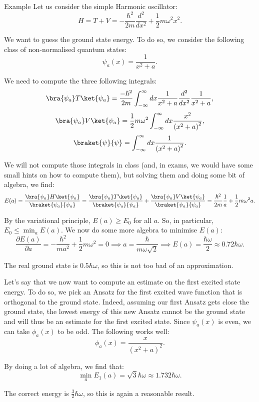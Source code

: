 \documentclass[a4paper]{article}
\begin{document}
\begin{parag}{Example}
    Let us consider the simple Harmonic oscillator: 
    \[H = T + V = -\frac{\hbar^2}{2m} \frac{d^2}{dx^2} + \frac{1}{2} m \omega^2 x^2.\]

    We want to guess the ground state energy. To do so, we consider the following class of non-normalised quantum states: 
    \[\psi_a\left(x\right) = \frac{1}{x^2 + a}.\]

    We need to compute the three following integrals: 
    \[\bra{\psi_a} T \ket{\psi_a} = \frac{-\hbar^2}{2m} \int_{-\infty}^{\infty} dx \frac{1}{x^2 + a} \frac{d^2}{dx^2} \frac{1}{x^2 + a},\]
    \[\bra{\psi_a} V \ket{\psi_a} = \frac{1}{2} m \omega^2 \int_{-\infty}^{\infty} dx \frac{x^2}{\left(x^2 + a\right)^2},\] 
    \[\braket{\psi}{\psi} = \int_{-\infty}^{\infty} dx \frac{1}{\left(x^2 + a\right)^2}.\]

    We will not compute those integrals in class (and, in exams, we would have some small hints on how to compute them), but solving them and doing some bit of algebra, we find: 
    \[E\left(a\right) = \frac{\bra{\psi_a} H \ket{\psi_a}}{\braket{\psi_a}{\psi_a}} = \frac{\bra{\psi_a} T \ket{\psi_a}}{\braket{\psi_a}{\psi_a}} + \frac{\bra{\psi_a} V \ket{\psi_a}}{\braket{\psi_a}{\psi_a}} = \frac{\hbar^2}{2m} \frac{1}{a} + \frac{1}{2} m \omega^2 a.\]

    By the variational principle, $E\left(a\right) \geq E_0$ for all $a$. So, in particular, $E_0 \leq \min_a E\left(a\right)$. We now do some more algebra to minimise $E\left(a\right)$: 
    \[\frac{\partial E\left(a\right)}{\partial a} = -\frac{\hbar^2}{ma^2} + \frac{1}{2} m \omega^2 = 0 \implies a = \frac{\hbar}{m \omega \sqrt{2}} \implies E\left(a\right) = \frac{\hbar \omega}{2} \approx 0.72\hbar\omega.\]

    The real ground state is $0.5 \hbar \omega$, so this is not too bad of an approximation.

    Let's say that we now want to compute an estimate on the first excited state energy. To do so, we pick an Ansatz for the first excited wave function that is orthogonal to the ground state. Indeed, assuming our first Ansatz gets close the ground state, the lowest energy of this new Ansatz cannot be the ground state and will thus be an estimate for the first excited state. Since $\psi_a\left(x\right)$ is even, we can take $\phi_a\left(x\right)$ to be odd. The following works well: 
    \[\phi_a\left(x\right) = \frac{x}{\left(x^2 + a\right)^2}.\]

    By doing a lot of algebra, we find that: 
    \[\min_a E_1\left(a\right) = \sqrt{3} \hbar \omega \approx 1.732 \hbar \omega.\]

    The correct energy is $\frac{3}{2} \hbar \omega$, so this is again a reasonable result.
\end{parag}
\end{document}

